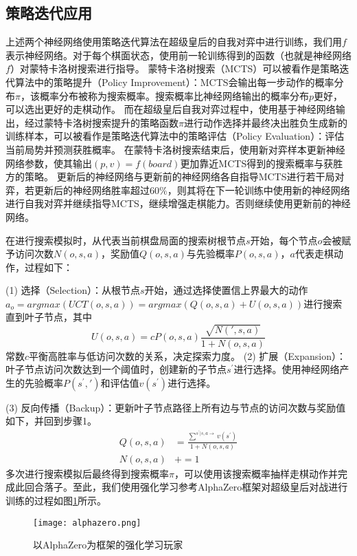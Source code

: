 \subsection{策略迭代应用}
上述两个神经网络使用策略迭代算法在超级皇后的自我对弈中进行训练，我们用$f$表示神经网络。对于每个棋面状态，使用前一轮训练得到的函数（也就是神经网络$f$）对蒙特卡洛树搜索进行指导。
蒙特卡洛树搜索（MCTS）可以被看作是策略迭代算法中的策略提升（Policy Improvement）：MCTS会输出每一步动作的概率分布$\pi$，该概率分布被称为搜索概率\cite{silver2009reinforcement}。搜索概率比神经网络输出的概率分布$p$更好，可以选出更好的走棋动作。
而在超级皇后自我对弈过程中，使用基于神经网络输出，经过蒙特卡洛树搜索提升的策略函数$\pi$进行动作选择并最终决出胜负生成新的训练样本，可以被看作是策略迭代算法中的策略评估（Policy Evaluation）：评估当前局势并预测获胜概率。
在蒙特卡洛树搜索结束后，使用新对弈样本更新神经网络参数，使其输出$(p,v)=f(board)$更加靠近MCTS得到的搜索概率与获胜方的策略。
更新后的神经网络与更新前的神经网络各自指导MCTS进行若干局对弈，若更新后的神经网络胜率超过$60\%$，则其将在下一轮训练中使用新的神经网络进行自我对弈并继续指导MCTS，继续增强走棋能力。否则继续使用更新前的神经网络。

在进行搜索模拟时，从代表当前棋盘局面的搜索树根节点$s$开始，每个节点$o$会被赋予访问次数$N(o,s,a)$，奖励值$Q(o,s,a)$与先验概率$P(o,s,a)$，$a$代表走棋动作，过程如下：

(1) 选择（Selection）：从根节点$s$开始，通过选择使置信上界最大的动作$a_{o} = argmax(UCT(o,s,a)) = argmax(Q(o,s,a) + U(o,s,a))$进行搜索直到叶子节点，其中
\begin{equation}
    U(o,s,a) = cP(o,s,a)\frac{\sqrt{N(',s,a)}}{1+N(o,s,a)}
\end{equation}
常数$c$平衡高胜率与低访问次数的关系，决定探索力度\cite{rosin2011multi}。
(2) 扩展（Expansion）：叶子节点访问次数达到一个阈值时，创建新的子节点$s^{'}$进行选择。使用神经网络产生的先验概率$P(s^{'},')$和评估值$v(s^{'})$进行选择。

(3) 反向传播（Backup）：更新叶子节点路径上所有边与节点的访问次数与奖励值如下，并回到步骤1\cite{segal2010scalability}。
\begin{equation}
    \begin{aligned}
    Q(o,s,a) &= \frac{\sum^{s^{'}|s,a\rightarrow}v(s^{'})}{1+N(o,s,a)} \\
    N(o,s,a) &+= 1 
    \end{aligned}
\end{equation}
多次进行搜索模拟后最终得到搜索概率$\pi$，可以使用该搜索概率抽样走棋动作并完成此回合落子。至此，我们使用强化学习参考AlphaZero框架对超级皇后对战进行训练的过程如图\ref{fig:az}所示。
\begin{figure}[H]
    \centering
    \texttt{[image: alphazero.png]}
    \caption[az]{%
    以AlphaZero为框架的强化学习玩家\cite{Silver2017}%
      }
    \label{fig:az}
\end{figure}


